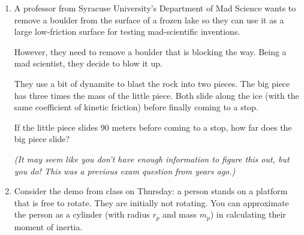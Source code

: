 \documentclass[12pt]{article}
\begin{document}
\begin{enumerate}
{\bf Hint 1:} The ``third kinematics relation'' $v_f^2 - v_0^2 = 2a\Delta x$ that you derived back in February will be very useful here, since you are never interested in the {\it time} these motions take, but care about relating the change in velocity to the distance traveled and the acceleration.

{\bf Hint 2:} There are multiple things that happen here. Conservation of momentum will help you understand some of them, but not others. First, draw four cartoons, and identify which method you can use to understand how to connect each cartoon to the next:

\begin{itemize}
	\item Right after Alice slides the puck to Bob
	\item Right before Bob picks up the puck
	\item Right after Bob picks up the puck
	\item When Bob comes to rest
\end{itemize}


\bigskip \newpage

\item A professor from Syracuse University's Department of Mad Science wants to remove a boulder from the surface of a frozen lake so they can use it as a large low-friction surface for testing mad-scientific inventions. 

However, they need to remove a boulder that is blocking the way. Being a mad scientist, they decide to blow it up.

They use a bit of dynamite to blast the rock into two pieces. The big piece has three times the mass of the little piece. Both slide along the ice (with the same coefficient of kinetic friction) before finally coming to a stop.

If the little piece slides 90 meters before coming to a stop, how far does the big piece slide?

{\it (It may seem like you don't have enough information to figure this out, but you do! This was a previous exam question from years ago.)}

\bigskip

\item Consider the demo from class on Thursday: a person stands on a platform that is free to rotate. They are initially not rotating. You can approximate the person as a cylinder (with radius $r_p$ and mass $m_p$) in calculating their moment of inertia.


\end{enumerate}
\end{document}
